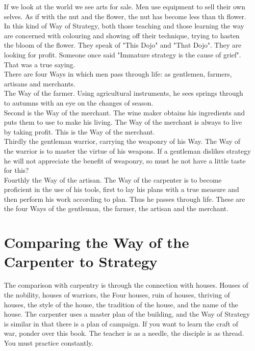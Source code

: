 If we look at the world we see arts for sale. Men use equipment to sell their own selves. As if with the nut and the flower, the nut has become less than th flower. In this kind of Way of Strategy, both those teaching and those learning the way are concerned with colouring and showing off their technique, trying to hasten the bloom of the flower. They speak of "This Dojo" and "That Dojo". They are looking for profit. Someone once said "Immature strategy is the cause of grief". That was a true saying.\\

There are four Ways in which men pass through life: as gentlemen, farmers, artisans and merchants.\\

The Way of the farmer. Using agricultural instruments, he sees springs through to autumns with an eye on the changes of season.\\

Second is the Way of the merchant. The wine maker obtains his ingredients and puts them to use to make his living. The Way of the merchant is always to live by taking profit. This is the Way of the merchant.\\

Thirdly the gentleman warrior, carrying the weaponry of his Way. The Way of the warrior is to master the virtue of his weapons. If a gentleman dislikes strategy he will not appreciate the benefit of weaponry, so must he not have a little taste for this?\\

Fourthly the Way of the artisan. The Way of the carpenter is to become proficient in the use of his tools, first to lay his plans with a true measure and then perform his work according to plan. Thus he passes through life. These are the four Ways of the gentleman, the farmer, the artisan and the merchant.\\
\section{Comparing the Way of the Carpenter to Strategy}

The comparison with carpentry is through the connection with houses. Houses of the nobility, houses of warriors, the Four houses, ruin of houses, thriving of houses, the style of the house, the tradition of the house, and the name of the house. The carpenter uses a master plan of the building, and the Way of Strategy is similar in that there is a plan of campaign. If you want to learn the craft of war, ponder over this book. The teacher is as a needle, the disciple is as thread. You must practice constantly.\\

